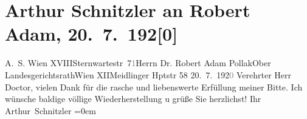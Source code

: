 

         
         \renewcommand{\erwaehntePersonen}{Personen: Robert Adam}
         \renewcommand{\erwaehnteOrte}{Orte: Erholungsheim der Bundesbeamten, Gutenstein, Meidlinger Hauptstraße, Niederösterreich, Sternwartestraße, Wien, XII., Meidling, XVIII., Währing}
         \renewcommand{\erwaehnteWerke}{}
               \section[Arthur Schnitzler an Robert Adam, 20. 7. 192{[}0{]}]{ Arthur Schnitzler an Robert Adam, 20. 7. 192{[}0{]}}\nopagebreak{}\rehead{ }\begin{ledgroupsized}[t]{13cm}\normalsize\beginnumbering \toendnotes[C]{\smallbreak\pagebreak[2]} 
\pstart{}{\pb}A. S. Wien XVIII\pend{}\pstart{}Sternwartestr 7\textcolor{gray}{1}\pend{}{\bigskip}\pstart{}Herrn Dr. Robert Adam Pollak\pend{}\pstart{}Ober Landesgerichtsrath\pend{}\pstart{}Wien XII\pend{}\pstart{}Meidlinger Hptstr 58\pend{}{\bigskip}\pstart
           \raggedleft{}{\pb}20. 7. 192\textcolor{gray}{0}\pend
           \pstart{}Verehrter Herr Doctor,\pend\pstart
           vielen Dank für die rasche und liebenswerte Erfüllung meiner Bitte.\pend
           \pstart
           Ich wünsche baldige völlige Wiederherstellung u grüße Sie herzlichst!\pend
           \pstart
           Ihr{\\[\baselineskip]}\spacefill\mbox{Arthur Schnitzler}\pend
           \leftskip=0em{}
         
         \endnumbering{}\end{ledgroupsized}  \newcommand{\dateiname}{L02351}\newcommand{\titel}{Arthur Schnitzler an Robert Adam, 20. 7. 192[0]}\newcommand{\editorInnen}{Martin Anton Müller und Gerd-Hermann Susen}
      